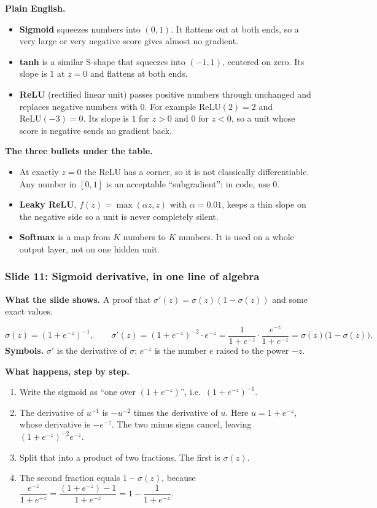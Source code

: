 \textbf{Plain English.}
\begin{itemize}
\item \textbf{Sigmoid} squeezes numbers into $(0,1)$. It flattens out at both ends, so a very large or very negative score gives almost no gradient.
\item \textbf{tanh} is a similar S-shape that squeezes into $(-1,1)$, centered on zero. Its slope is $1$ at $z=0$ and flattens at both ends.
\item \textbf{ReLU} (rectified linear unit) passes positive numbers through unchanged and replaces negative numbers with $0$. For example $\text{ReLU}(2)=2$ and $\text{ReLU}(-3)=0$. Its slope is $1$ for $z>0$ and $0$ for $z<0$, so a unit whose score is negative sends no gradient back.
\end{itemize}

\textbf{The three bullets under the table.}
\begin{itemize}
\item At exactly $z=0$ the ReLU has a corner, so it is not classically differentiable. Any number in $[0,1]$ is an acceptable ``subgradient''; in code, use $0$.
\item \textbf{Leaky ReLU}, $f(z)=\max(\alpha z, z)$ with $\alpha = 0.01$, keeps a thin slope on the negative side so a unit is never completely silent.
\item \textbf{Softmax} is a map from $K$ numbers to $K$ numbers. It is used on a whole output layer, not on one hidden unit.
\end{itemize}

\subsubsection{Slide 11: Sigmoid derivative, in one line of algebra}

\textbf{What the slide shows.} A proof that $\sigma'(z) = \sigma(z)(1-\sigma(z))$ and some exact values.

\[
\sigma(z) = (1+e^{-z})^{-1}, \qquad
\sigma'(z) = (1+e^{-z})^{-2}\cdot e^{-z} = \frac{1}{1+e^{-z}}\cdot\frac{e^{-z}}{1+e^{-z}} = \sigma(z)\big(1-\sigma(z)\big).
\]
\textbf{Symbols.} $\sigma'$ is the derivative of $\sigma$; $e^{-z}$ is the number $e$ raised to the power $-z$.

\textbf{What happens, step by step.}
\begin{enumerate}
\item Write the sigmoid as ``one over $(1+e^{-z})$'', i.e.\ $(1+e^{-z})^{-1}$.
\item The derivative of $u^{-1}$ is $-u^{-2}$ times the derivative of $u$. Here $u = 1+e^{-z}$, whose derivative is $-e^{-z}$. The two minus signs cancel, leaving $(1+e^{-z})^{-2}e^{-z}$.
\item Split that into a product of two fractions. The first is $\sigma(z)$.
\item The second fraction equals $1-\sigma(z)$, because $\dfrac{e^{-z}}{1+e^{-z}} = \dfrac{(1+e^{-z})-1}{1+e^{-z}} = 1-\dfrac{1}{1+e^{-z}}$.
\end{enumerate}


